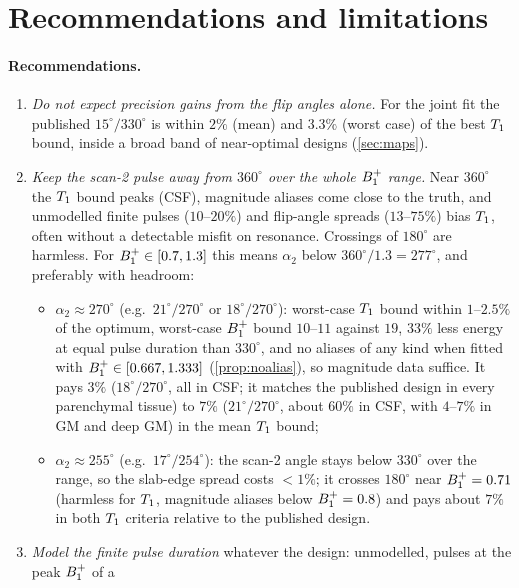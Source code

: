 \section{Recommendations and limitations}\label{sec:recommendations}

\paragraph{Recommendations.}
\begin{enumerate}
\item \emph{Do not expect precision gains from the flip angles alone.} For the joint fit the
  published $15^\circ/330^\circ$ is within $2\%$ (mean) and $3.3\%$ (worst case) of the best $T_1$ bound, inside a
  broad band of near-optimal designs (\cref{sec:maps}).
\item \emph{Keep the scan-2 pulse away from $360^\circ$ over the whole $B_1^{+}$ range.} Near $360^\circ$ the $T_1$ bound
  peaks (CSF), magnitude aliases come close to the truth, and unmodelled finite pulses
  ($10$--$20\%$) and flip-angle spreads ($13$--$75\%$) bias $T_1$, often without a detectable misfit on
  resonance. Crossings of $180^\circ$ are
  harmless. For $B_1^{+}\in[0.7,1.3]$ this means $\alpha_2$ below $360^\circ/1.3=277^\circ$, and preferably with headroom:
  \begin{itemize}
  \item $\alpha_2\approx270^\circ$ (e.g.\ $21^\circ/270^\circ$ or $18^\circ/270^\circ$): worst-case $T_1$ bound within $1$--$2.5\%$ of the optimum,
    worst-case $B_1^{+}$ bound $10$--$11$ against $19$, $33\%$ less energy at equal pulse duration than $330^\circ$, and
    no aliases of any kind when fitted with $B_1^{+}\in[0.667,1.333]$ (\cref{prop:noalias}), so magnitude
    data suffice. It pays $3\%$ ($18^\circ/270^\circ$, all in CSF; it matches the published design in every
    parenchymal tissue) to $7\%$ ($21^\circ/270^\circ$, about $60\%$ in CSF, with $4$--$7\%$ in GM and deep GM) in the
    mean $T_1$ bound;
  \item $\alpha_2\approx255^\circ$ (e.g.\ $17^\circ/254^\circ$): the scan-2 angle stays below $330^\circ$ over the range, so the
    slab-edge spread costs $<1\%$; it crosses $180^\circ$ near $B_1^{+}=0.71$ (harmless for $T_1$, magnitude aliases
    below $B_1^{+}=0.8$) and pays about $7\%$ in both $T_1$ criteria relative to the published design.
  \end{itemize}
\item \emph{Model the finite pulse duration} whatever the design: unmodelled, pulses at the peak $B_1^{+}$ of a

\end{enumerate}

